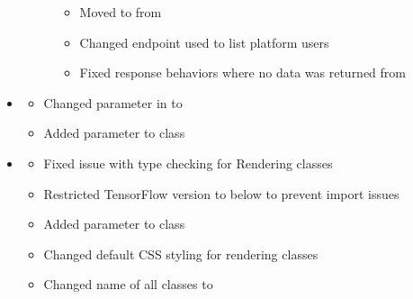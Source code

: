 \documentclass[letterpaper,10pt,english]{sphinxmanual}
\begin{document}
\begin{itemize}
\begin{description}
\begin{itemize}
\item {} 
\sphinxAtStartPar
Moved  to  from 

\item {} 
\sphinxAtStartPar
Changed endpoint used to list platform users

\item {} 
\sphinxAtStartPar
Fixed response behaviors where no data was returned from 

\end{itemize}

\end{description}

\item {} \begin{description}
\begin{itemize}
\item {} 
\sphinxAtStartPar
Changed  parameter in  to 

\item {} 
\sphinxAtStartPar
Added  parameter to  class

\end{itemize}

\end{description}

\item {} \begin{description}
\begin{itemize}
\item {} 
\sphinxAtStartPar
Fixed issue with type checking for  Rendering classes

\item {} 
\sphinxAtStartPar
Restricted TensorFlow version to below  to prevent import issues

\item {} 
\sphinxAtStartPar
Added  parameter to  class

\item {} 
\sphinxAtStartPar
Changed default CSS styling for rendering classes

\item {} 
\sphinxAtStartPar
Changed name of all  classes to 


\end{itemize}
\end{description}
\end{itemize}
\end{document}
